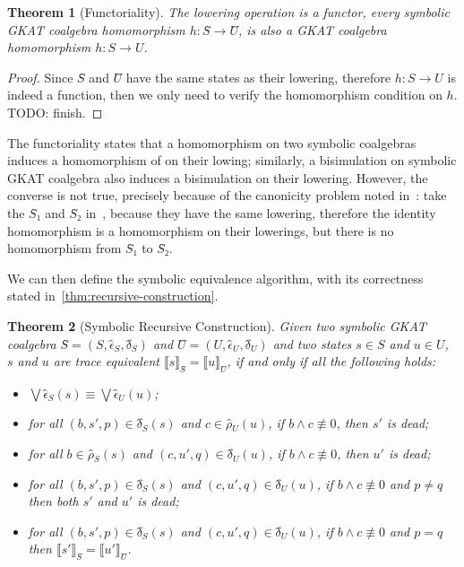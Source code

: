 \documentclass[conference]{IEEEtran}
\newtheorem{theorem}{Theorem}
\begin{document}
\begin{theorem}[Functoriality]\label{thm:lowering-functor}
    The lowering operation is a functor, every symbolic GKAT coalgebra homomorphism \(h: Ŝ → Û\), is also a GKAT coalgebra homomorphism \(h: S → U\).
\end{theorem}

\begin{proof}
    Since \(Ŝ\) and \(Û\) have the same states as their lowering, therefore \(h: S → U\) is indeed a function, then we only need to verify the homomorphism condition on \(h\).
    TODO: finish.
\end{proof}

The functoriality states that a homomorphism on two symbolic coalgebras induces a homomorphism of on their lowing; similarly, a bisimulation on symbolic GKAT coalgebra also induces a bisimulation on their lowering.
However, the converse is not true, precisely because of the canonicity problem noted in~: take the \(Ŝ₁\) and \(Ŝ₂\) in~, because they have the same lowering, therefore the identity homomorphism is a homomorphism on their lowerings, but there is no homomorphism from \(Ŝ₁\) to \(Ŝ₂\).

We can then define the symbolic equivalence algorithm, with its correctness stated in~\cref{thm:recursive-construction}.

\begin{theorem}[Symbolic Recursive Construction]\label{thm:symb-recursive-construction}
    Given two symbolic GKAT coalgebra \(Ŝ = (S, ϵ̂_S, δ̂_S)\) and \(Û = (U, ϵ̂_U, δ̂_U)\) and two states \(s ∈ S\) and \(u ∈ U\), \(s\) and \(u\) are trace equivalent \(⟦s⟧_{Ŝ} = ⟦u⟧_{Û}\), if and only if all the following holds:
    \begin{itemize}
        \item \(⋁ ϵ̂_S(s) ≡ ⋁ ϵ̂_U(u)\); 
        \item for all \((b, s', p) ∈ δ̂_S(s)\) and \(c ∈ ρ̂_U(u)\), if \(b ∧ c ≢ 0\), then \(s'\) is dead;
        \item for all \(b ∈ ρ̂_S(s)\) and \((c, u', q) ∈ δ̂_U(u)\), if \(b ∧ c ≢ 0\), then \(u'\) is dead;
        \item for all \((b, s', p) ∈ δ̂_S(s)\) and \((c, u', q) ∈ δ̂_U(u)\), if \(b ∧ c ≢ 0\) and \(p ≠ q\) then both \(s'\) and \(u'\) is dead; 
        \item for all \((b, s', p) ∈ δ̂_S(s)\) and \((c, u', q) ∈ δ̂_U(u)\), if \(b ∧ c ≢ 0\) and \(p = q\) then \(⟦s'⟧_{Ŝ} = ⟦u'⟧_{Û}\).
    \end{itemize}
\end{theorem}
\end{document}
